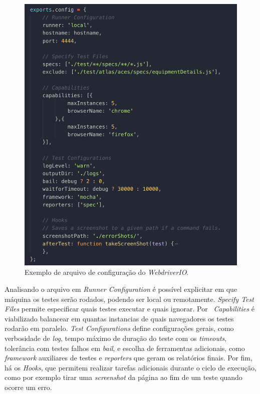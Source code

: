 \begin{figure}[H]
    \centering
    \includegraphics[width=13cm]{source/4-solucao/images/webdriverio.png}
    \caption{Exemplo de arquivo de configuração do \emph{WebdriverIO}.}
    \label{fig:webdriverio}
\end{figure}

Analisando o arquivo em \emph{Runner Configuration} é possível explicitar em que máquina os testes serão rodados, podendo ser local ou remotamente. \emph{Specify Test Files} permite especificar quais testes executar e quais ignorar. Por \emph{~Capabilities} é viabilizado balancear em quantas instancias de quais navegadores os testes rodarão em paralelo. \emph{Test Configurations} define configurações gerais, como verbosidade de \emph{log}, tempo máximo de duração do teste com os \emph{timeouts}, tolerância com testes falhos em \emph{bail}, e escolha de ferramentas adicionais, como \emph{framework} auxiliares de testes e \emph{reporters} que geram os relatórios finais. Por fim, há os \emph{Hooks}, que permitem realizar tarefas adicionais durante o ciclo de execução, como por exemplo tirar uma \emph{screenshot} da página ao fim de um teste quando ocorre um erro.

